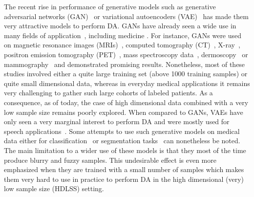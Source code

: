 \documentclass[10pt,journal,compsoc]{IEEEtran}
\begin{document}
The recent rise in performance of generative models such as generative adversarial networks (GAN)~\cite{goodfellow_generative_2014} or variational autoencoders (VAE)~\cite{kingma_auto-encoding_2014,rezende_stochastic_2014} has made them very attractive models to perform DA. GANs have already seen a wide use in many fields of application~\cite{zhu_emotion_2018, mariani_bagan_2018,antoniou_data_2018, lim_doping_2018,zhu_data_2018}, including medicine \cite{yi_generative_2019}. For instance, GANs were used on magnetic resonance images (MRIs)~\cite{shin_medical_2018, calimeri_biomedical_2017}, computed tomography (CT)~\cite{frid-adar_gan-based_2018,sandfort_data_2019}, X-ray~\cite{madani_chest_2018,salehinejad_generalization_2018, waheed_covidgan_2020 }, positron emission tomography (PET)~\cite{bi_synthesis_2017}, mass spectroscopy data~\cite{liu_wasserstein_2019}, dermoscopy~\cite{baur_generating_2018} or mammography~\cite{korkinof_high-resolution_2018,wu_conditional_2018} and demonstrated promising results. Nonetheless, most of these studies involved either a quite large training set (above 1000 training samples) or quite small dimensional data, whereas in everyday medical applications it remains very challenging to gather such large cohorts of labeled patients. As a consequence, as of today, the case of high dimensional data combined with a very low sample size remains poorly explored. When compared to GANs, VAEs have only seen a very marginal interest to perform DA and were mostly used for speech applications~\cite{hsu_unsupervised_2017,nishizaki_data_2017,wu_data_2019}. Some attempts to use such generative models on medical data either for classification~\cite{zhuang_fmri_2019,liu_data_2018} or segmentation tasks~\cite{painchaud_cardiac_2019,selvan_lung_2020,myronenko_3d_2018} can nonetheless be noted. The main limitation to a wider use of these models is that they most of the time produce blurry and fuzzy samples. This undesirable effect is even more emphasized when they are trained with a small number of samples which makes them very hard to use in practice to perform DA in the high dimensional (very) low sample size (HDLSS) setting.
\end{document}
